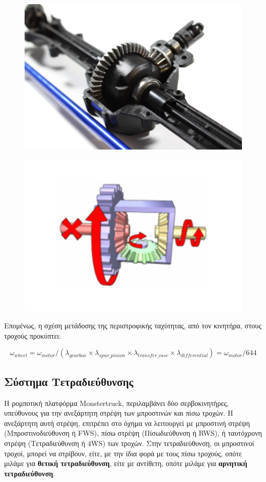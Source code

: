 \begin{figure}[!ht]
	\begin{minipage}{.49\textwidth}
		\centering
		\includegraphics[width=0.5\linewidth]{Chapters/Chapter2/Figures/differential.png}
		\label{fig:differential}
	\end{minipage}
	\begin{minipage}{.5\textwidth}
	 	\centering		
		\includegraphics[width=0.5\linewidth]		
			{Chapters/Chapter2/Figures/differential_function.png}
		\label{fig:differential_function}
	\end{minipage}
\end{figure}

\bigskip
Επομένως, η σχέση μετάδοσης της περιστροφικής ταχύτητας, από τον κινητήρα, στους τροχούς προκύπτει:

\begin{equation}
	\omega_{wheel} = \omega_{motor} / (\lambda_{gearbox} \times \lambda_{spur\_pinion} \times \lambda_{transfer\_case} \times \lambda_{differential}) = \omega_{motor} / 644
\end{equation}

\bigskip
\subsection{Σύστημα Τετραδιεύθυνσης} \label{ssec:four_wheel_steering}
Η ρομποτική πλατφόρμα {Monstertruck}, περιλαμβάνει δύο σερβοκινητήρες, υπεύθυνους για την ανεξάρτητη στρέψη των μπροστινών και πίσω τροχών. Η ανεξάρτητη αυτή στρέψη, επιτρέπει στο όχημα να λειτουργεί με μπροστινή στρέψη ({Μπροστινοδιεύθυνση ή FWS}), πίσω στρέψη ({Πίσωδιεύθυνση ή RWS}), ή ταυτόχρονη στρέψη ({Τετραδιεύθυνση ή 4WS}) των τροχών. Στην {τετραδιεύθυνση}, οι μπροστινοί τροχοί, μπορεί να στρίβουν, είτε, με την ίδια φορά με τους πίσω τροχούς, οπότε μιλάμε για \textbf{θετική τετραδιεύθυνση}, είτε με αντίθετη, οπότε μιλάμε για \textbf{αρνητική τετραδιεύθυνση}.

